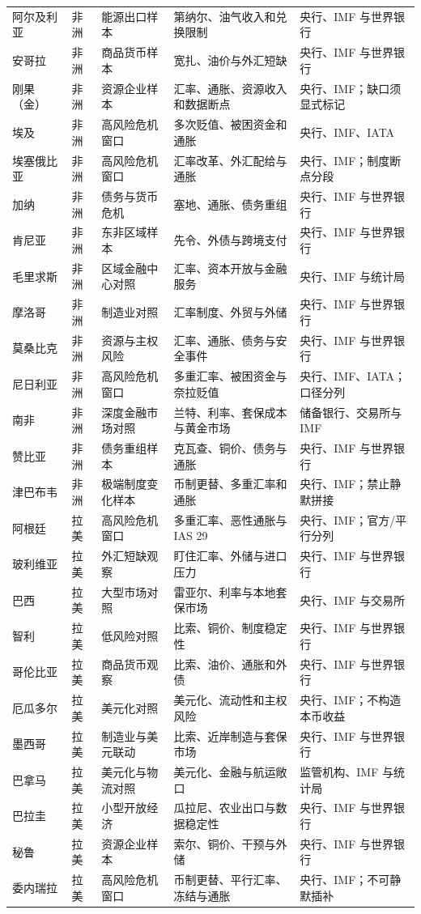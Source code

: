 \documentclass[UTF8,12pt,openany]{ctexbook}
\begin{document}
\begin{longtable}{p{2.1cm}p{1.4cm}p{2.8cm}p{3.6cm}p{3.3cm}}
\midrule
阿尔及利亚 & 非洲 & 能源出口样本 & 第纳尔、油气收入和兑换限制 & 央行、IMF 与世界银行\\
安哥拉 & 非洲 & 商品货币样本 & 宽扎、油价与外汇短缺 & 央行、IMF 与世界银行\\
刚果（金） & 非洲 & 资源企业样本 & 汇率、通胀、资源收入和数据断点 & 央行、IMF；缺口须显式标记\\
埃及 & 非洲 & 高风险危机窗口 & 多次贬值、被困资金和通胀 & 央行、IMF、IATA\\
埃塞俄比亚 & 非洲 & 高风险危机窗口 & 汇率改革、外汇配给与通胀 & 央行、IMF；制度断点分段\\
加纳 & 非洲 & 债务与货币危机 & 塞地、通胀、债务重组 & 央行、IMF 与世界银行\\
肯尼亚 & 非洲 & 东非区域样本 & 先令、外债与跨境支付 & 央行、IMF 与世界银行\\
毛里求斯 & 非洲 & 区域金融中心对照 & 汇率、资本开放与金融服务 & 央行、IMF 与统计局\\
摩洛哥 & 非洲 & 制造业对照 & 汇率制度、外贸与外储 & 央行、IMF 与世界银行\\
莫桑比克 & 非洲 & 资源与主权风险 & 汇率、通胀、债务与安全事件 & 央行、IMF 与世界银行\\
尼日利亚 & 非洲 & 高风险危机窗口 & 多重汇率、被困资金与奈拉贬值 & 央行、IMF、IATA；口径分列\\
南非 & 非洲 & 深度金融市场对照 & 兰特、利率、套保成本与黄金市场 & 储备银行、交易所与 IMF\\
赞比亚 & 非洲 & 债务重组样本 & 克瓦查、铜价、债务与通胀 & 央行、IMF 与世界银行\\
津巴布韦 & 非洲 & 极端制度变化样本 & 币制更替、多重汇率和通胀 & 央行、IMF；禁止静默拼接\\
\midrule
阿根廷 & 拉美 & 高风险危机窗口 & 多重汇率、恶性通胀与 IAS 29 & 央行、IMF；官方/平行分列\\
玻利维亚 & 拉美 & 外汇短缺观察 & 盯住汇率、外储与进口压力 & 央行、IMF 与世界银行\\
巴西 & 拉美 & 大型市场对照 & 雷亚尔、利率与本地套保市场 & 央行、IMF 与交易所\\
智利 & 拉美 & 低风险对照 & 比索、铜价、制度稳定性 & 央行、IMF 与世界银行\\
哥伦比亚 & 拉美 & 商品货币观察 & 比索、油价、通胀和外债 & 央行、IMF 与世界银行\\
厄瓜多尔 & 拉美 & 美元化对照 & 美元化、流动性和主权风险 & 央行、IMF；不构造本币收益\\
墨西哥 & 拉美 & 制造业与美元联动 & 比索、近岸制造与套保市场 & 央行、IMF 与世界银行\\
巴拿马 & 拉美 & 美元化与物流对照 & 美元化、金融与航运敞口 & 监管机构、IMF 与统计局\\
巴拉圭 & 拉美 & 小型开放经济 & 瓜拉尼、农业出口与数据稳定性 & 央行、IMF 与世界银行\\
秘鲁 & 拉美 & 资源企业样本 & 索尔、铜价、干预与外储 & 央行、IMF 与世界银行\\
委内瑞拉 & 拉美 & 高风险危机窗口 & 币制更替、平行汇率、冻结与通胀 & 央行、IMF；不可静默插补\\
\bottomrule
\end{longtable}
\normalsize
\end{document}
